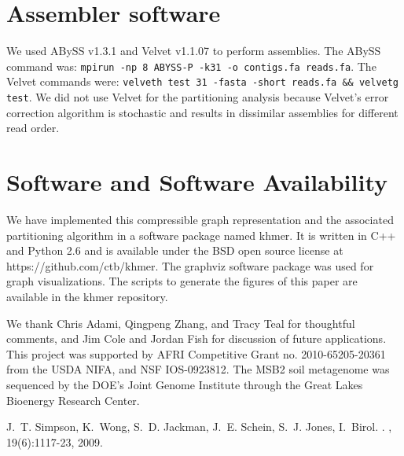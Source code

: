 \documentclass{pnastwo}
\begin{document}
\begin{article}
\begin{materials}
\section{Assembler software}

We used ABySS v1.3.1 and Velvet v1.1.07 to perform assemblies.
The ABySS command was: {\tt mpirun -np 8 ABYSS-P -k31 -o contigs.fa reads.fa}.
The Velvet commands were: {\tt velveth test 31 -fasta -short reads.fa \&\& velvetg test}.
We did not use Velvet for the partitioning analysis because Velvet's
error correction algorithm is stochastic and results in dissimilar
assemblies for different read order.

\section{Software and Software Availability}

We have implemented this compressible graph representation and the associated
partitioning algorithm in a
software package named khmer.  It is written in C++ and Python 2.6 and
is available under the BSD open source license at
https://github.com/ctb/khmer.  The graphviz software package was used
for graph visualizations. The scripts to generate the figures of this
paper are available in the khmer repository.

\end{materials}

\begin{acknowledgments}

We thank Chris Adami, Qingpeng Zhang, and Tracy Teal for
thoughtful comments, and Jim Cole and Jordan Fish for discussion of future
applications.  This project was supported by AFRI Competitive Grant
no. 2010-65205-20361 from the USDA NIFA, and NSF IOS-0923812.  The
MSB2 soil metagenome was sequenced by the DOE's Joint Genome
Institute through the Great Lakes Bioenergy Research Center.

\end{acknowledgments}




\begin{thebibliography}{10}

J.~T. Simpson, K.~Wong, S.~D. Jackman, J.~E. Schein, S.~J. Jones, I.~Birol.
.
, 19(6):1117-23, 2009.


\end{thebibliography}
\end{article}
\end{document}
